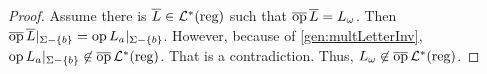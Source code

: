 \begin{theorem}
\begin{proof}
Assume there is $\overline L \in \mathcal{L}^*(\text{reg})$ such that $\operatorname{\overline{op}} \overline L =  L_\omega$. Then $\dop \overline{L}|_{\Sigma-\Set{b}} = \op {L_a} |_{\Sigma-\Set{b}}$. However, because of \cref{gen:multLetterInv}, $\op {L_a} |_{\Sigma-\Set{b}} \not\in \dop \Langreg$. That is a contradiction. Thus, $L_\omega \not\in \operatorname{\overline{op}} \mathcal{L}^*(\text{reg})$.
%
%
%

\end{proof}
\end{theorem}

